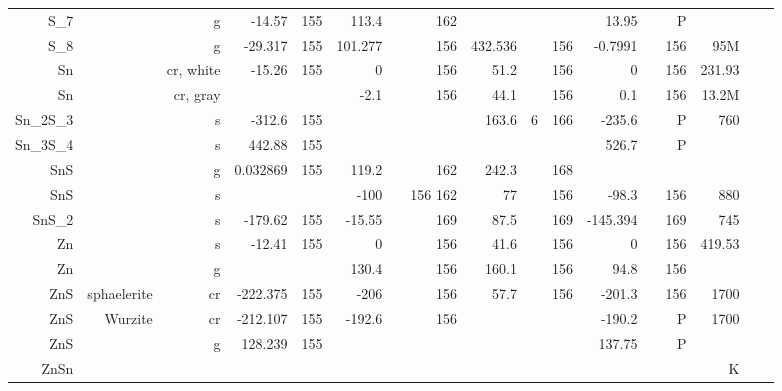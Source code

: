 \begin{table}[htbp]
\begin{adjustbox}{width=1\textwidth}
\begin{tabular}{rrrrrrrrrrrrrrrrr}
    S\_7  &       & g     & -14.57 & 155   & 113.4 &       & 162   &       &       &       & 13.95 &       & P     &       &       &  \\
    S\_8  &       & g     & -29.317 & 155   & 101.277 &       & 156   & 432.536 &       & 156   & -0.7991 &       & 156   & 95M   &       &  \\
    Sn    &       & cr, white & -15.26 & 155   & 0     &       & 156   & 51.2  &       & 156   & 0     &       & 156   & 231.93 &       &  \\
    Sn    &       & cr, gray &       &       & -2.1  &       & 156   & 44.1  &       & 156   & 0.1   &       & 156   & 13.2M &       &  \\
    Sn\_2S\_3 &       & s     & -312.6 & 155   &       &       &       & 163.6 & 6     & 166   & -235.6 &       & P     & 760   &       &  \\
    Sn\_3S\_4 &       & s     & 442.88 & 155   &       &       &       &       &       &       & 526.7 &       & P     &       &       &  \\
    SnS   &       & g     & 0.032869 & 155   & 119.2 &       & 162   & 242.3 &       & 168   &       &       &       &       &       &  \\
    SnS   &       & s     &       &       & -100  &       & 156 162 & 77    &       & 156   & -98.3 &       & 156   & 880   &       &  \\
    SnS\_2 &       & s     & -179.62 & 155   & -15.55 &       & 169   & 87.5  &       & 169   & -145.394 &       & 169   & 745   &       &  \\
    Zn    &       & s     & -12.41 & 155   & 0     &       & 156   & 41.6  &       & 156   & 0     &       & 156   & 419.53 &       &  \\
    Zn    &       & g     &       &       & 130.4 &       & 156   & 160.1 &       & 156   & 94.8  &       & 156   &       &       &  \\
    ZnS   & sphaelerite & cr    & -222.375 & 155   & -206  &       & 156   & 57.7  &       & 156   & -201.3 &       & 156   & 1700  &       &  \\
    ZnS   & Wurzite & cr    & -212.107 & 155   & -192.6 &       & 156   &       &       &       & -190.2 &       & P     & 1700  &       &  \\
    ZnS   &       & g     & 128.239 & 155   &       &       &       &       &       &       & 137.75 &       & P     &       &       &  \\
    ZnSn  &       &       &       &       &       &       &       &       &       &       &       &       &       & K     &       &  \\

\end{tabular}
\end{adjustbox}
\end{table}
